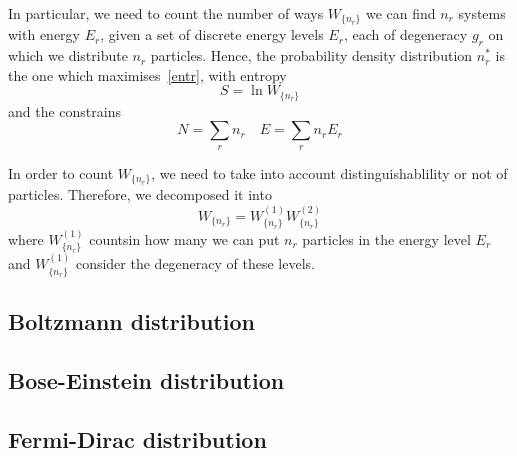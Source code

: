     In particular, we need to count the number of ways $W_{\{n_r\}}$ we can find $n_r$ systems with energy $E_r$, given a set of discrete energy levels $E_r$, each of degeneracy $g_r$ on which we distribute $n_r$ particles. Hence, the probability density distribution $n_r^*$ is the one which maximises~\eqref{entr}, with entropy 
    \begin{equation*}
        S = \ln W_{\{n_r\}}
    \end{equation*} 
    and the constrains 
    \begin{equation*}
        N = \sum_{r} n_r \quad E = \sum_r n_r E_r
    \end{equation*}

    In order to count $W_{\{n_r\}}$, we need to take into account distinguishablility or not of particles. Therefore, we decomposed it into 
    \begin{equation*}
        W_{\{n_r\}} = W_{\{n_r\}}^{(1)} W_{\{n_r\}}^{(2)}
    \end{equation*}
    where $W_{\{n_r\}}^{(1)}$ countsin how many we can put $n_r$ particles in the energy level $E_r$ and $W_{\{n_r\}}^{(1)}$ consider the degeneracy of these levels.

\subsection{Boltzmann distribution}
\subsection{Bose-Einstein distribution}
\subsection{Fermi-Dirac distribution}